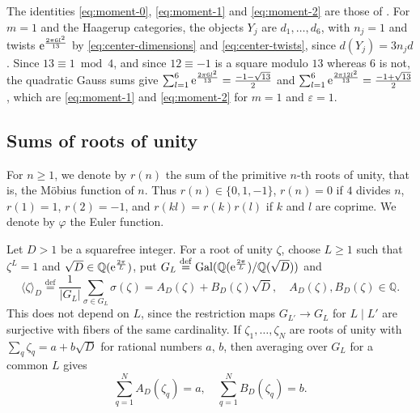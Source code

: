 \documentclass[leqno]{article}
\renewcommand{\geq}{\ensuremath{\geqslant}}
\let\i\relax %
\newcommand{\i}{\mathrm{i}}
\newcommand{\ov}{\overset}
\newcommand{\epsi}{\varepsilon}
\newcommand{\e}{\mathrm{e}} %
\numberwithin{equation}{section}
\begin{document}
The identities \eqref{eq:moment-0}, \eqref{eq:moment-1} and \eqref{eq:moment-2} are those of \cite[(25) p.~7]{Hua26}. For $m = 1$ and the Haagerup categories, the objects $Y_j$ are $d_1, \ldots, d_6$, with $n_j = 1$ and twists $\e^{\frac{2\pi\i 6l^2}{13}}$ by \eqref{eq:center-dimensions} and \eqref{eq:center-twists}, since $d(Y_j) = 3n_jd$. Since $13 \equiv 1 \bmod 4$, and since $12 \equiv -1$ is a square modulo $13$ whereas $6$ is not, the quadratic Gauss sums give $\sum_{l=1}^6\e^{\frac{2\pi\i 6l^2}{13}} = \frac{-1-\sqrt{13}}{2}$ and $\sum_{l=1}^6\e^{\frac{2\pi\i 12l^2}{13}} = \frac{-1+\sqrt{13}}{2}$, which are \eqref{eq:moment-1} and \eqref{eq:moment-2} for $m = 1$ and $\epsi = 1$.

\subsection{Sums of roots of unity}
\label{subsec:roots-of-unity}

For $n \geq 1$, we denote by $r(n)$ the sum of the primitive $n$-th roots of unity, that is, the Möbius function of $n$. Thus $r(n) \in \{0,1,-1\}$, $r(n) = 0$ if $4$ divides $n$, $r(1) = 1$, $r(2) = -1$, and $r(kl) = r(k)r(l)$ if $k$ and $l$ are coprime. We denote by $\varphi$ the Euler function.

Let $D > 1$ be a squarefree integer. For a root of unity $\zeta$, choose $L \geq 1$ such that $\zeta^L = 1$ and $\sqrt D \in \mathbb{Q}(\e^{\frac{2\pi\i}{L}})$, put $G_L \ov{\mathrm{def}}{=} \operatorname{Gal}(\mathbb{Q}(\e^{\frac{2\pi\i}{L}})/\mathbb{Q}(\sqrt D))$ and
\[
\langle \zeta \rangle_D \ov{\mathrm{def}}{=} \frac{1}{|G_L|}\sum_{\sigma \in G_L}\sigma(\zeta) = A_D(\zeta)+B_D(\zeta)\sqrt D,\quad A_D(\zeta), B_D(\zeta) \in \mathbb{Q}.
\]
This does not depend on $L$, since the restriction maps $G_{L'} \to G_L$ for $L \mid L'$ are surjective with fibers of the same cardinality. If $\zeta_1, \ldots, \zeta_N$ are roots of unity with $\sum_q \zeta_q = a+b\sqrt D$ for rational numbers $a$, $b$, then averaging over $G_L$ for a common $L$ gives
\begin{equation}
\label{eq:average-sum}
\sum_{q=1}^N A_D(\zeta_q) = a,\quad \sum_{q=1}^N B_D(\zeta_q) = b.
\end{equation}
\end{document}

